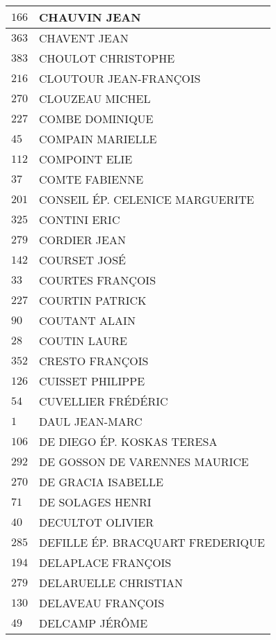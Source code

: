 \begin{xltabular}{\linewidth}{|l|X|}
    \hline
    $166$ & CHAUVIN JEAN \\
    \hline
    $363$ & CHAVENT JEAN \\
    \hline
    $383$ & CHOULOT CHRISTOPHE \\
    \hline
    $216$ & CLOUTOUR JEAN-FRANÇOIS \\
    \hline
    $270$ & CLOUZEAU MICHEL \\
    \hline
    $227$ & COMBE DOMINIQUE \\
    \hline
    $45$ & COMPAIN MARIELLE \\
    \hline
    $112$ & COMPOINT ELIE \\
    \hline
    $37$ & COMTE FABIENNE \\
    \hline
    $201$ & CONSEIL ÉP. CELENICE MARGUERITE \\
    \hline
    $325$ & CONTINI ERIC \\
    \hline
    $279$ & CORDIER JEAN \\
    \hline
    $142$ & COURSET JOSÉ \\
    \hline
    $33$ & COURTES FRANÇOIS \\
    \hline
    $227$ & COURTIN PATRICK \\
    \hline
    $90$ & COUTANT ALAIN \\
    \hline
    $28$ & COUTIN LAURE \\
    \hline
    $352$ & CRESTO FRANÇOIS \\
    \hline
    $126$ & CUISSET PHILIPPE \\
    \hline
    $54$ & CUVELLIER FRÉDÉRIC \\
    \hline
    $1$ & DAUL JEAN-MARC \\
    \hline
    $106$ & DE DIEGO ÉP. KOSKAS TERESA \\
    \hline
    $292$ & DE GOSSON DE VARENNES MAURICE \\
    \hline
    $270$ & DE GRACIA ISABELLE \\
    \hline
    $71$ & DE SOLAGES HENRI \\
    \hline
    $40$ & DECULTOT OLIVIER \\
    \hline
    $285$ & DEFILLE ÉP. BRACQUART FREDERIQUE \\
    \hline
    $194$ & DELAPLACE FRANÇOIS \\
    \hline
    $279$ & DELARUELLE CHRISTIAN \\
    \hline
    $130$ & DELAVEAU FRANÇOIS \\
    \hline
    $49$ & DELCAMP JÉRÔME \\
    \hline

\end{xltabular}

